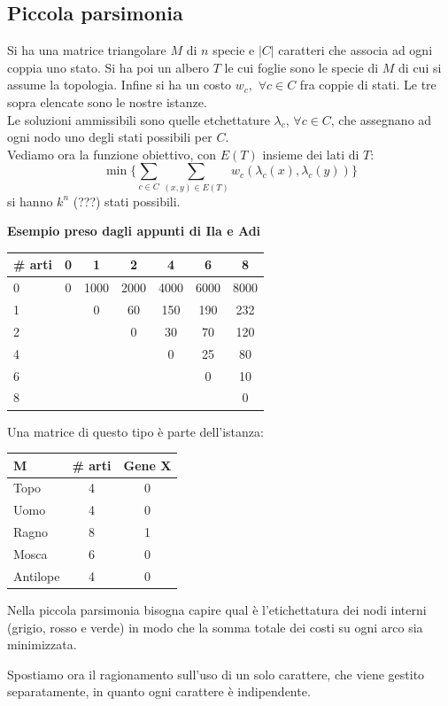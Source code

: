\documentclass[a4paper,12pt, oneside]{book}
\begin{document}
\subsection{Piccola parsimonia}
Si ha una matrice triangolare $M$ di $n$ specie e $|C|$ caratteri che
associa ad ogni coppia uno stato. Si ha poi un albero $T$ le cui
foglie sono le specie di $M$ di cui si assume la topologia. Infine si
ha un costo $w_c,\,\,\forall c\in C$ fra coppie 
di stati. Le tre sopra elencate sono le nostre istanze. \\
Le soluzioni ammissibili sono quelle etchettature $\lambda_c$,
$\forall c\in C$, che assegnano ad ogni nodo uno degli stati
possibili per $C$.\\
Vediamo ora la funzione obiettivo, con $E(T)$ insieme dei lati di $T$:
\[\min\{\sum_{c\in C}\sum_{(x,y)\in
    E(T)}w_c(\lambda_c(x),\lambda_c(y))\}\]
si hanno $k^n$ (???) stati possibili.\\

\begin{esempio}
  \textbf{Esempio preso dagli appunti di Ila e Adi}\\
  \begin{center}
    \begin{tabular}{l | *{6}{c}}
      \# arti & 0 & 1 & 2 & 4 & 6 & 8 \\
      \hline
      0 & 0 & 1000 & 2000 & 4000 & 6000 & 8000 \\
      1 & ~ & 0 & 60 & 150 & 190 & 232 \\
      2 & ~ & ~ & 0 & 30 & 70 & 120 \\
      4 & ~ & ~ & ~ & 0 & 25 & 80\\
      6 & ~ & ~ & ~ & ~ & 0 & 10\\
      8 & ~ & ~ & ~ & ~ & ~ & 0
    \end{tabular}
  \end{center}
  Una matrice di questo tipo è parte dell’istanza:
  \begin{center}
    \begin{tabular}{l | c c}
      M & \# arti & Gene X \\
      \hline
      Topo & 4 & 0 \\
      Uomo & 4 & 0 \\
      Ragno & 8 & 1 \\
      Mosca & 6 & 0 \\
      Antilope & 4 & 0
    \end{tabular}
  \end{center}
  Nella piccola parsimonia bisogna capire qual è l’etichettatura dei
  nodi interni (grigio, rosso e 
  verde) in modo che la somma totale dei costi su ogni arco sia minimizzata.
\end{esempio}
Spostiamo ora il ragionamento sull'uso di un solo carattere, che viene
gestito separatamente, in quanto ogni carattere è indipendente.
\end{document}
